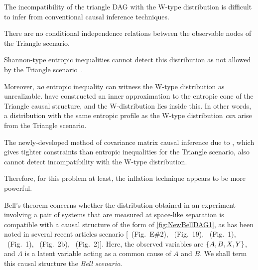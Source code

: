 The incompatibility of the triangle DAG with the W-type distribution is difficult to infer from conventional causal inference techniques.
\begin{compactenum}
\item There are no conditional independence relations between the observable nodes of the Triangle scenario. %
\item Shannon-type entropic inequalities cannot detect this distribution as not allowed by the Triangle scenario~\cite{fritz2013marginal,chaves2014novel,chaves2014informationinference}. 
\item Moreover, \emph{no} entropic inequality can witness the W-type distribution as unrealizable. \citet{weilenmann2016entropic} have constructed an inner approximation to the entropic cone of the Triangle causal structure, and the W-distribution lies inside this. In other words, a distribution with the same entropic profile as the W-type distribution \emph{can} arise from the Triangle scenario.
\item The newly-developed method of covariance matrix causal inference due to \citet{kela2016covariance}, which gives tighter constraints than entropic inequalities for the Triangle scenario, also cannot detect incompatibility with the W-type distribution.
\end{compactenum}
Therefore, for this problem at least, the inflation technique appears to be more powerful.

\par\smallskip\nobreak

Bell's theorem concerns whether the distribution obtained in an experiment involving a pair of systems that are measured at space-like separation \cite{bell1964einstein,Brunner2013Bell,bell1966lhvm,CHSHOriginal} is compatible with a causal structure of the form of \cref{fig:NewBellDAG1}, as has been noted in several recent articles \cite{bell1964einstein,Brunner2013Bell,bell1966lhvm,CHSHOriginal} scenario [\citealp{pusey2014gdag}~(Fig.~E\#2), \citealp{WoodSpekkens}~(Fig.~19), \citealp{chaves2014novel}~(Fig.~1), \citealp{BeyondBellII}~(Fig.~1), \citealp{wolfe2015nonconvexity}~(Fig.~2b), \citealp{steeg2011relaxation}~(Fig.~2)].  Here, the observed variables are $\left\lbrace A,B,X,Y\right\rbrace$, and $\Lambda$ is a latent variable acting as a common cause of $A$ and $B$.   We shall term this causal structure the \emph{Bell scenario}.

